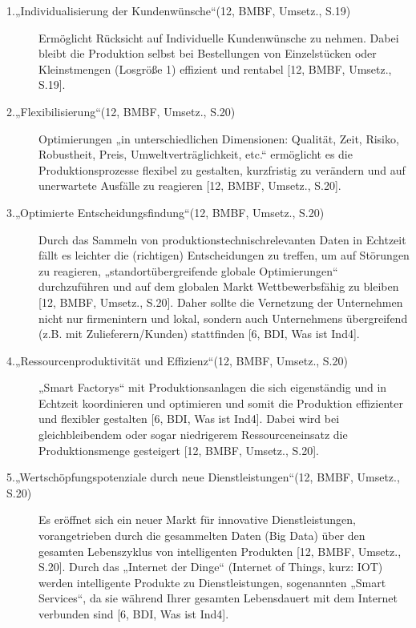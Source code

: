 \begin{description}
	\item[1.„Individualisierung der Kundenwünsche“(12, BMBF, Umsetz., S.19)]

	Ermöglicht Rücksicht auf Individuelle Kundenwünsche zu nehmen. Dabei bleibt die 
	Produktion selbst bei Bestellungen von Einzelstücken oder Kleinstmengen (Losgröße 1) 
	effizient und rentabel [12, BMBF, Umsetz., S.19].
	
	\item[2.„Flexibilisierung“(12, BMBF, Umsetz., S.20)]
	
	Optimierungen „in unterschiedlichen Dimensionen: Qualität, Zeit, Risiko, Robustheit, Preis,
	Umweltverträglichkeit, etc.“ ermöglicht es die Produktionsprozesse flexibel zu gestalten,
	kurzfristig zu verändern und auf unerwartete Ausfälle zu reagieren [12, BMBF, Umsetz., S.20].
		
	\item[3.„Optimierte Entscheidungsfindung“(12, BMBF, Umsetz., S.20)]
	
	Durch das Sammeln von produktionstechnischrelevanten Daten in Echtzeit fällt es leichter
	die (richtigen) Entscheidungen zu treffen, um auf Störungen zu reagieren, 
	„standortübergreifende globale Optimierungen“ durchzuführen und auf dem globalen Markt 
	Wettbewerbsfähig zu bleiben [12, BMBF, Umsetz., S.20]. Daher sollte die Vernetzung der 
	Unternehmen nicht nur firmenintern und lokal, sondern auch Unternehmens übergreifend 
	(z.B. mit Zulieferern/Kunden) stattfinden [6, BDI, Was ist Ind4].
		
	\item[4.„Ressourcenproduktivität und Effizienz“(12, BMBF, Umsetz., S.20)]
	
	„Smart Factorys“ mit Produktionsanlagen die sich eigenständig und in Echtzeit koordinieren 
	und optimieren und somit die Produktion effizienter und flexibler gestalten [6, BDI, Was ist 
	Ind4]. Dabei wird bei gleichbleibendem oder sogar niedrigerem Ressourceneinsatz die 
	Produktionsmenge gesteigert [12, BMBF, Umsetz., S.20].
			
	\item[5.„Wertschöpfungspotenziale durch neue Dienstleistungen“(12, BMBF, Umsetz., S.20)]
	
	Es eröffnet sich ein neuer Markt für innovative Dienstleistungen, vorangetrieben durch die
	gesammelten Daten (Big Data) über den gesamten Lebenszyklus von intelligenten Produkten 
	[12, BMBF, Umsetz., S.20]. Durch das „Internet der Dinge“ (Internet of Things, kurz: IOT)
	werden intelligente Produkte zu Dienstleistungen, sogenannten „Smart Services“, da sie 
	während Ihrer gesamten Lebensdauert mit dem Internet verbunden sind [6, BDI, Was ist 
	Ind4].
			

\end{description}
